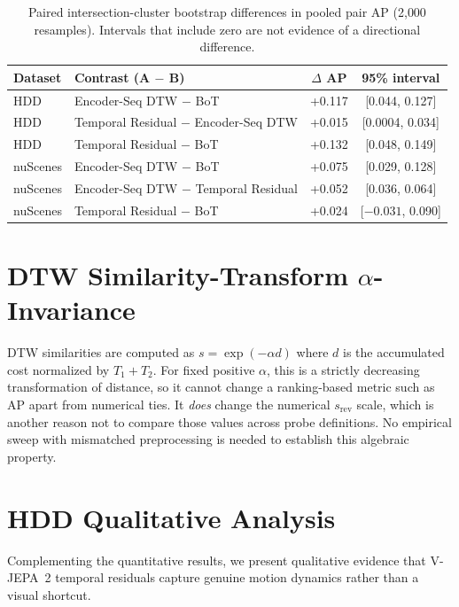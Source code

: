 \documentclass{article}
\theoremstyle{remark}
\begin{document}
\begin{table}[h]
\centering
\caption{Paired intersection-cluster bootstrap differences in pooled pair AP (2{,}000 resamples). Intervals that include zero are not evidence of a directional difference.}
\label{tab:paired_bootstrap}
\begin{tabular}{llcc}
\toprule
\textbf{Dataset} & \textbf{Contrast (A $-$ B)} & \textbf{$\Delta$ AP} & \textbf{95\% interval} \\
\midrule
HDD & Encoder-Seq DTW $-$ BoT & +0.117 & [0.044, 0.127] \\
HDD & Temporal Residual $-$ Encoder-Seq DTW & +0.015 & [0.0004, 0.034] \\
HDD & Temporal Residual $-$ BoT & +0.132 & [0.048, 0.149] \\
\midrule
nuScenes & Encoder-Seq DTW $-$ BoT & +0.075 & [0.029, 0.128] \\
nuScenes & Encoder-Seq DTW $-$ Temporal Residual & +0.052 & [0.036, 0.064] \\
nuScenes & Temporal Residual $-$ BoT & +0.024 & [$-0.031$, 0.090] \\
\bottomrule
\end{tabular}
\end{table}

\section{DTW Similarity-Transform $\alpha$-Invariance}
\label{sec:alpha_sweep}

DTW similarities are computed as $s = \exp(-\alpha d)$ where $d$ is the accumulated cost normalized by $T_1+T_2$. For fixed positive $\alpha$, this is a strictly decreasing transformation of distance, so it cannot change a ranking-based metric such as AP apart from numerical ties. It \emph{does} change the numerical $s_\text{rev}$ scale, which is another reason not to compare those values across probe definitions. No empirical sweep with mismatched preprocessing is needed to establish this algebraic property.

\section{HDD Qualitative Analysis}
\label{sec:hdd_qualitative}

Complementing the quantitative results, we present qualitative evidence that V-JEPA~2 temporal residuals capture genuine motion dynamics rather than a visual shortcut.
\end{document}
